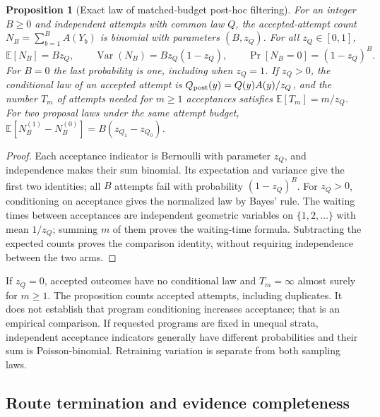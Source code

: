 \documentclass{article}
\newtheorem{proposition}[theorem]{Proposition}
\theoremstyle{definition}
\begin{document}
\begin{proposition}[Exact law of matched-budget post-hoc filtering]
\label{prop:posthoc-budget}
For an integer $B\geq0$ and independent attempts with common law $Q$, the accepted-attempt count
$N_B=\sum_{b=1}^BA(Y_b)$ is binomial with parameters $(B,z_Q)$. For all $z_Q\in[0,1]$,
\begin{equation}
 \mathbb E[N_B]=Bz_Q,\qquad
 \operatorname{Var}(N_B)=Bz_Q(1-z_Q),\qquad
 \Pr[N_B=0]=(1-z_Q)^B.
\end{equation}
For $B=0$ the last probability is one, including when $z_Q=1$. If $z_Q>0$, the conditional law of
an accepted attempt is $Q_{\rm post}(y)=Q(y)A(y)/z_Q$, and the number $T_m$ of attempts needed for
$m\geq1$ acceptances satisfies $\mathbb E[T_m]=m/z_Q$.
For two proposal laws under the same attempt budget,
$\mathbb E[N_B^{(1)}-N_B^{(0)}]=B(z_{Q_1}-z_{Q_0})$.
\end{proposition}
\begin{proof}
Each acceptance indicator is Bernoulli with parameter $z_Q$, and independence makes their sum
binomial. Its expectation and variance give the first two identities; all $B$ attempts fail with
probability $(1-z_Q)^B$. For $z_Q>0$, conditioning on acceptance gives the normalized law by
Bayes' rule. The waiting times between acceptances are independent geometric variables on
$\{1,2,\ldots\}$ with mean $1/z_Q$; summing $m$ of them proves the waiting-time formula.
Subtracting the expected counts proves the comparison identity, without requiring independence
between the two arms.
\end{proof}
If $z_Q=0$, accepted outcomes have no conditional law and $T_m=\infty$ almost surely for $m\geq1$.
The proposition counts accepted attempts, including duplicates. It does not establish that program
conditioning increases acceptance; that is an empirical comparison. If requested programs are fixed
in unequal strata, independent acceptance indicators generally have different probabilities and
their sum is Poisson-binomial. Retraining variation is separate from both sampling laws.

\subsection{Route termination and evidence completeness}
\end{document}
